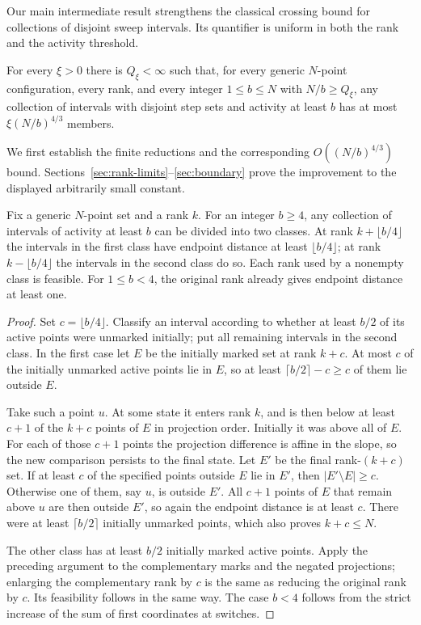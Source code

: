 Our main intermediate result strengthens the classical crossing bound
for collections of disjoint sweep intervals. Its quantifier is uniform
in both the rank and the activity threshold.

\begin{theorem}\label{thm:activity-packing}
For every $\xi>0$ there is $Q_\xi<\infty$ such that, for every generic
$N$-point configuration, every rank, and every integer $1\le b\le N$
with $N/b\ge Q_\xi$, any collection of intervals with disjoint step
sets and activity at least $b$ has at most $\xi(N/b)^{4/3}$ members.
\end{theorem}

We first establish the finite reductions and the corresponding
$O((N/b)^{4/3})$ bound. Sections~\ref{sec:rank-limits}--\ref{sec:boundary}
prove the improvement to the displayed arbitrarily small constant.

\begin{lemma}\label{lem:activity-distance}
Fix a generic $N$-point set and a rank $k$.  For an integer $b\ge4$,
any collection of intervals of activity at least $b$ can be divided
into two classes.  At rank $k+\lfloor b/4\rfloor$ the intervals in
the first class have endpoint distance at least $\lfloor b/4\rfloor$;
at rank $k-\lfloor b/4\rfloor$ the intervals in the second class do
so.  Each rank used by a nonempty class is feasible.  For $1\le b<4$,
the original rank already gives endpoint distance at least one.
\end{lemma}

\begin{proof}
Set $c=\lfloor b/4\rfloor$.  Classify an interval according to whether
at least $b/2$ of its active points were unmarked initially; put all
remaining intervals in the second class.  In the first case let $E$
be the initially marked set at rank $k+c$.  At most $c$ of the initially
unmarked active points lie in $E$, so at least
$\lceil b/2\rceil-c\ge c$ of them lie outside $E$.

Take such a point $u$.  At some state it enters rank $k$, and is then
below at least $c+1$ of the $k+c$ points of $E$ in projection order.
Initially it was above all of $E$.  For each of those $c+1$ points the
projection difference is affine in the slope, so the new comparison
persists to the final state.  Let $E'$ be the final rank-$(k+c)$ set.
If at least $c$ of the specified points outside $E$ lie in $E'$, then
$|E'\setminus E|\ge c$.  Otherwise one of them, say $u$, is outside
$E'$.  All $c+1$ points of $E$ that remain above $u$ are then outside
$E'$, so again the endpoint distance is at least $c$.
There were at least $\lceil b/2\rceil$ initially unmarked points, which
also proves $k+c\le N$.

The other class has at least $b/2$ initially marked active points.
Apply the preceding argument to the complementary marks and the
negated projections; enlarging the complementary rank by $c$ is
the same as reducing the original rank by $c$.  Its feasibility follows
in the same way.  The case $b<4$ follows from the strict increase of
the sum of first coordinates at switches.
\end{proof}

